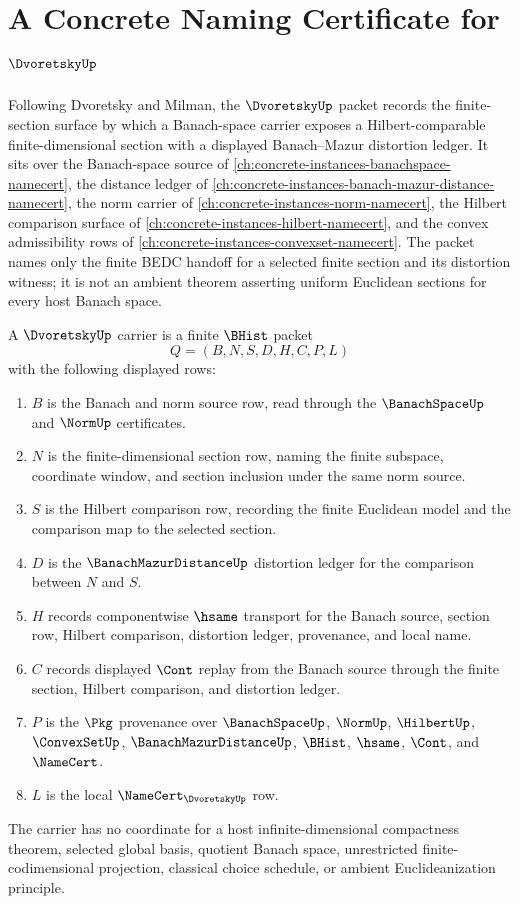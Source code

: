 \chapter{A Concrete Naming Certificate for $\DvoretskyUp$}
\label{ch:concrete-instances-dvoretsky-namecert}

Following Dvoretsky and Milman, the $\DvoretskyUp$ packet records the finite-section surface by which a Banach-space carrier exposes a Hilbert-comparable finite-dimensional section with a displayed Banach--Mazur distortion ledger. It sits over the Banach-space source of \autoref{ch:concrete-instances-banachspace-namecert}, the distance ledger of \autoref{ch:concrete-instances-banach-mazur-distance-namecert}, the norm carrier of \autoref{ch:concrete-instances-norm-namecert}, the Hilbert comparison surface of \autoref{ch:concrete-instances-hilbert-namecert}, and the convex admissibility rows of \autoref{ch:concrete-instances-convexset-namecert}. The packet names only the finite BEDC handoff for a selected finite section and its distortion witness; it is not an ambient theorem asserting uniform Euclidean sections for every host Banach space.

\begin{definition}
\label{def:dvoretsky-carrier}
A $\DvoretskyUp$ carrier is a finite $\BHist$ packet
$$
Q=(B,N,S,D,H,C,P,L)
$$
with the following displayed rows:
\begin{enumerate}
\item $B$ is the Banach and norm source row, read through the $\BanachSpaceUp$ and $\NormUp$ certificates.
\item $N$ is the finite-dimensional section row, naming the finite subspace, coordinate window, and section inclusion under the same norm source.
\item $S$ is the Hilbert comparison row, recording the finite Euclidean model and the comparison map to the selected section.
\item $D$ is the $\BanachMazurDistanceUp$ distortion ledger for the comparison between $N$ and $S$.
\item $H$ records componentwise $\hsame$ transport for the Banach source, section row, Hilbert comparison, distortion ledger, provenance, and local name.
\item $C$ records displayed $\Cont$ replay from the Banach source through the finite section, Hilbert comparison, and distortion ledger.
\item $P$ is the $\Pkg$ provenance over $\BanachSpaceUp$, $\NormUp$, $\HilbertUp$, $\ConvexSetUp$, $\BanachMazurDistanceUp$, $\BHist$, $\hsame$, $\Cont$, and $\NameCert$.
\item $L$ is the local $\NameCert_{\DvoretskyUp}$ row.
\end{enumerate}
The carrier has no coordinate for a host infinite-dimensional compactness theorem, selected global basis, quotient Banach space, unrestricted finite-codimensional projection, classical choice schedule, or ambient Euclideanization principle.
\end{definition}

